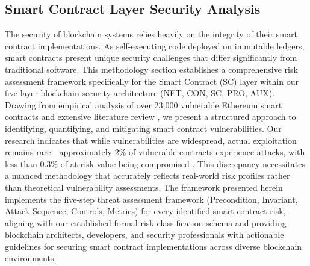\subsection{Smart Contract Layer Security Analysis}
\label{sec:results_smart_contract}

The security of blockchain systems relies heavily on the integrity of their smart contract implementations. As self-executing code deployed on immutable ledgers, smart contracts present unique security challenges that differ significantly from traditional software. This methodology section establishes a comprehensive risk assessment framework specifically for the Smart Contract (SC) layer within our five-layer blockchain security architecture (NET, CON, SC, PRO, AUX). Drawing from empirical analysis of over 23,000 vulnerable Ethereum smart contracts \cite{perez2021analysis} and extensive literature review \cite{praitheeshan2019systematic,zhou2023sok}, we present a structured approach to identifying, quantifying, and mitigating smart contract vulnerabilities. Our research indicates that while vulnerabilities are widespread, actual exploitation remains rare—approximately 2\% of vulnerable contracts experience attacks, with less than 0.3\% of at-risk value being compromised \cite{perez2021analysis}. This discrepancy necessitates a nuanced methodology that accurately reflects real-world risk profiles rather than theoretical vulnerability assessments. The framework presented herein implements the five-step threat assessment framework (Precondition, Invariant, Attack Sequence, Controls, Metrics) for every identified smart contract risk, aligning with our established formal risk classification schema \cite{Wang2019} and providing blockchain architects, developers, and security professionals with actionable guidelines for securing smart contract implementations across diverse blockchain environments.

